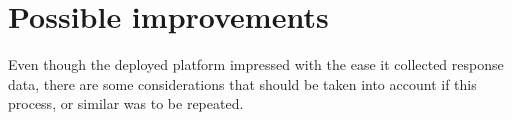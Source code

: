 %
%
%
%
%


\section{Possible improvements}

  Even though the deployed platform impressed with the ease it collected
  response data, there are some considerations that should be taken into
  account if this process, or similar was to be repeated.

